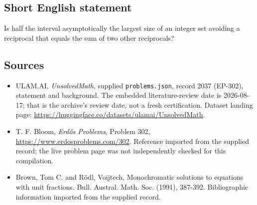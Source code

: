 \documentclass[11pt,a4paper]{article}
\begin{document}
\subsection{Short English statement}

Is half the interval asymptotically the largest size of an integer set avoiding a reciprocal that equals the sum of two other reciprocals?

\subsection{Sources}

{\small

\begin{itemize}

\item[\hypertarget{source:2037:1}{S1}] ULAM.AI, \emph{UnsolvedMath}, supplied \texttt{problems.json}, record 2037 (EP-302), statement and background. The embedded literature-review date is 2026-08-17; that is the archive’s review date, not a fresh certification. Dataset landing page: \url{https://huggingface.co/datasets/ulamai/UnsolvedMath}.

\item[\hypertarget{source:2037:2}{S2}] T. F. Bloom, \emph{Erdős Problems}, Problem 302, \url{https://www.erdosproblems.com/302}. Reference imported from the supplied record; the live problem page was not independently checked for this compilation.

\item[\hypertarget{source:2037:3}{S3}] Brown, Tom C. and R\"{o}dl, Voijtech, Monochromatic solutions to equations with unit fractions. Bull. Austral. Math. Soc. (1991), 387-392. Bibliographic information imported from the supplied record.

\end{itemize}

}

\label{end:2037}
\end{document}
